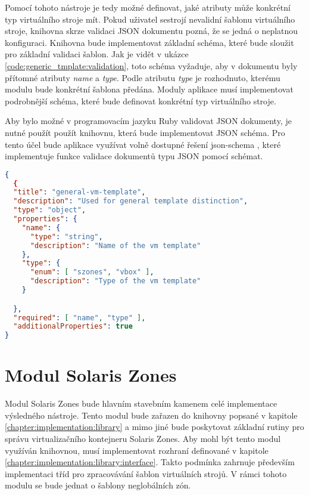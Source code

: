 Pomocí tohoto nástroje je tedy možné definovat, jaké atributy může konkrétní typ virtuálního stroje mít. Pokud uživatel sestrojí
nevalidní šablonu virtuálního stroje, knihovna skrze validaci JSON dokumentu pozná, že se jedná o neplatnou konfiguraci. Knihovna
bude implementovat základní schéma, které bude sloužit pro základní validaci šablon. Jak je vidět v ukázce \ref{code:generic_tmplate:validation},
toto schéma vyžaduje, aby v dokumentu byly přítomné atributy \textit{name} a \textit{type}. Podle atributu \textit{type} je 
rozhodnuto, kterému modulu bude konkrétní šablona předána. Moduly aplikace musí implementovat podrobnější schéma, které bude
definovat konkrétní typ virtuálního stroje.

Aby bylo možné v programovacím jazyku Ruby validovat JSON dokumenty, je nutné použít použít knihovnu, která bude implementovat
JSON schéma. Pro tento účel bude aplikace využívat volně dostupné řešení json-schema \cite{json:schema:ruby}, které implementuje
funkce validace dokumentů typu JSON pomocí schémat.
\begin{lstlisting}[language=json, caption={Schéma generické šablony}, float, label={code:generic_tmplate:validation}]  
{
  {
  "title": "general-vm-template",
  "description": "Used for general template distinction",
  "type": "object",
  "properties": {
    "name": {
      "type": "string",
      "description": "Name of the vm template"
    },
    "type": {
      "enum": [ "szones", "vbox" ],
      "description": "Type of the vm template"
    }

  },
  "required": [ "name", "type" ],
  "additionalProperties": true
}
\end{lstlisting}
\section{Modul Solaris Zones}
\label{chapter:implementation:szones}
Modul Solaris Zones bude hlavním stavebním kamenem celé implementace výsledného nástroje. Tento modul bude zařazen do knihovny
popsané v kapitole \ref{chapter:implementation:library} a mimo jiné bude poskytovat základní rutiny pro správu virtualizačního
kontejneru Solaris Zones. Aby mohl být tento modul využíván knihovnou, musí implementovat rozhraní definované v kapitole \ref{chapter:implementation:library:interface}.
Takto podmínka zahrnuje především implementaci tříd pro zpracovávání šablon virtuálních strojů. V rámci tohoto modulu se bude
jednat o šablony neglobálních zón. 

